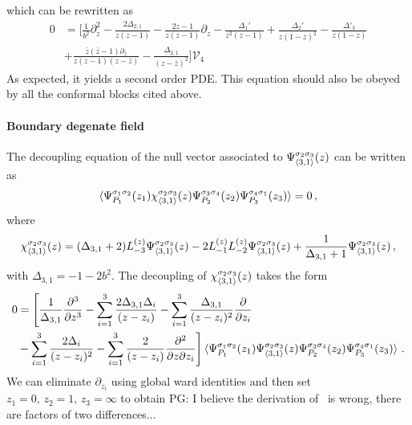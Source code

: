 \documentclass[a4paper]{article}
\newcommand{\purple}[1]{{\color{purple} #1 \color{black}}}
\newcommand{\PG}[1]{{\purple{PG: #1}}} %
\begin{document}
which can be rewritten as
\begin{equation}
\begin{aligned}
  0&=\Bigg[\frac{1}{b^2}\partial_z^2-\frac{2\Delta_{2,1}}{z(z-1)}-\frac{2z-1}{z(z-1)}\partial_z -\frac{\Delta_1'}{z^2(z-1)}+\frac{\Delta_2'}{z(1-z)^2}-\frac{\Delta'_3}{z(1-z)}\\
  &+\frac{\bar{z}(\bar{z}-1)\partial_{\bar{z}}}{z(z-1)(z-\bar{z})}-\frac{\Delta_{2,1}}{(z-\bar{z})^2}\Bigg]\mathcal{V}_{4}
\end{aligned}
\end{equation}
As expected, it yields a second order PDE. This equation should also be obeyed by all the conformal blocks cited above.
\paragraph{Boundary degenate field}
The decoupling equation of the null vector associated to $\Psi^{\sigma_2 \sigma_3}_{\braket{3,1}}(z)$ can be written as~\cite{Belavin:1984vu}
\begin{equation}
  \braket{\Psi_{P_1}^{\sigma_1 \sigma_2}(z_1)\chi_{\braket{3,1}}^{\sigma_2 \sigma_3}(z)\Psi_{P_2}^{\sigma_3 \sigma_4}(z_2)\Psi_{P_3}^{\sigma_4 \sigma_1}(z_3)}=0\,,
\end{equation}
where
\begin{equation}
  \chi_{\braket{3,1}}^{\sigma_2 \sigma_3}(z) = (\Delta_{3,1}+2)L_{-3}^{(z)}\Psi^{\sigma_2 \sigma_3}_{\braket{3,1}}(z) -2 L^{(z)}_{-1}L^{(z)}_{-2}\Psi^{\sigma_2 \sigma_3}_{\braket{3,1}}(z)+\frac{1}{\Delta_{3,1}+1}\Psi^{\sigma_2 \sigma_3}_{\braket{3,1}}(z)\,,
\end{equation}
with $\Delta_{3,1}=-1-2b^2$. The decoupling of $\chi_{\braket{3,1}}^{\sigma_2 \sigma_3}(z)$ takes the form~\cite{Belavin:1984vu}
\begin{equation}
\begin{aligned}
  0&=\Bigg[\frac{1}{\Delta_{3,1}}\frac{\partial^3}{\partial z^3}-\sum_{i=1}^3 \frac{2\Delta_{3,1}\Delta_i}{(z-z_i)}-\sum_{i=1}^3\frac{\Delta_{3,1}}{(z-z_i)^2}\frac{\partial}{\partial z_i}\\
  &-\sum_{i=1}^3 \frac{2\Delta_i}{(z-z_i)^2}-\sum_{i=1}^3 \frac{2}{(z-z_i)}\frac{\partial^2}{\partial z \partial z_i}\Bigg]\braket{\Psi_{P_1}^{\sigma_1 \sigma_2}(z_1)\Psi^{\sigma_2 \sigma_3}_{\braket{3,1}}(z)\Psi_{P_2}^{\sigma_3 \sigma_4}(z_2)\Psi_{P_3}^{\sigma_4 \sigma_1}(z_3)}\,.
\end{aligned}
\end{equation}
We can eliminate $\partial_{z_i}$ using global ward identities and then set $z_1=0,\,z_2=1,\,z_3=\infty$ to obtain\PG{I believe the derivation of~\cite{Belavin:1984vu} is wrong, there are factors of two differences...}
\end{document}
